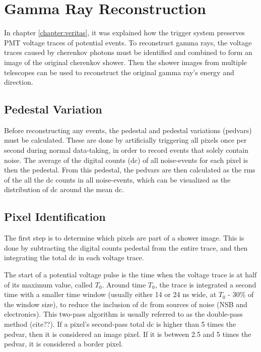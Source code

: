 \cleartooddpage[\thispagestyle{empty}]
\chapter{Gamma Ray Reconstruction}\label{ch:grrecon}

In chapter \ref{chapter:veritas}, it was explained how the trigger system preserves PMT voltage traces of potential events.
To reconstruct gamma rays, the voltage traces caused by cherenkov photons must be identified and combined to form an image of the original cherenkov shower.
Then the shower images from multiple telescopes can be used to reconstruct the original gamma ray's energy and direction.

\section{Pedestal Variation}
  Before reconstructing any events, the pedestal and pedestal variations (pedvars) must be calculated.
  These are done by artificially triggering all pixels once per second during normal data-taking, in order to record events that solely contain noise.
  The average of the digital counts (dc) of all noise-events for each pixel is then the pedestal.
  From this pedestal, the pedvars are then calculated as the rms of the all the dc counts in all noise-events, which can be visualized as the distribution of dc around the mean dc.

\section{Pixel Identification}
  The first step is to determine which pixels are part of a shower image.
  This is done by subtracting the digital counts pedestal from the entire trace, and then integrating the total dc in each voltage trace.

  The start of a potential voltage pulse is the time when the voltage trace is at half of its maximum value, called $T_{0}$.
  Around time $T_{0}$, the trace is integrated a second time with a smaller time window (usually either 14 or 24 ns wide, at $T_0$ - 30\% of the window size), to reduce the inclusion of dc from sources of noise (NSB and electronics).
  This two-pass algorithm is usually referred to as the double-pass method (cite??).
  If a pixel's second-pass total dc is higher than 5 times the pedvar, then it is considered an image pixel.
  If it is between 2.5 and 5 times the pedvar, it is considered a border pixel.

